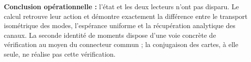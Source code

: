 \textbf{Conclusion opérationnelle :} l'état et les deux lecteurs n'ont pas disparu. Le calcul retrouve leur action et démontre exactement la différence entre le transport isométrique des modes, l'espérance uniforme et la récupération analytique des canaux. La seconde identité de moments dispose d'une voie concrète de vérification au moyen du connecteur commun ; la conjugaison des cartes, à elle seule, ne réalise pas cette vérification.
